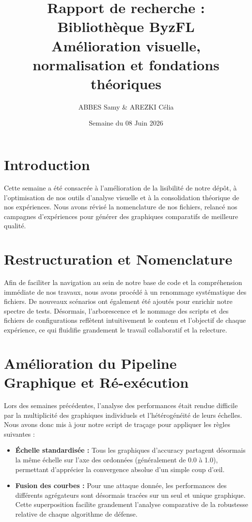 \documentclass[11pt, a4paper]{article}
\title{\textbf{Rapport de recherche : Bibliothèque ByzFL} \\ \large Amélioration visuelle, normalisation et fondations théoriques}
\author{ABBES Samy \& AREZKI Célia}
\date{Semaine du 08 Juin 2026}
\begin{document}
\maketitle

\section{Introduction}
Cette semaine a été consacrée à l'amélioration de la lisibilité de notre dépôt, à l'optimisation de nos outils d'analyse visuelle et à la consolidation théorique de nos expériences. Nous avons révisé la nomenclature de nos fichiers, relancé nos campagnes d'expériences pour générer des graphiques comparatifs de meilleure qualité.

\section{Restructuration et Nomenclature}
Afin de faciliter la navigation au sein de notre base de code et la compréhension immédiate de nos travaux, nous avons procédé à un renommage systématique des fichiers. 
De nouveaux scénarios ont également été ajoutés pour enrichir notre spectre de tests. Désormais, l'arborescence et le nommage des scripts et des fichiers de configurations reflètent intuitivement le contenu et l'objectif de chaque expérience, ce qui fluidifie grandement le travail collaboratif et la relecture.

\section{Amélioration du Pipeline Graphique et Ré-exécution}
Lors des semaines précédentes, l'analyse des performances était rendue difficile par la multiplicité des graphiques individuels et l'hétérogénéité de leurs échelles. Nous avons donc mis à jour notre script de traçage pour appliquer les règles suivantes :
\begin{itemize}
    \item \textbf{Échelle standardisée :} Tous les graphiques d'accuracy partagent désormais la même échelle sur l'axe des ordonnées (généralement de 0.0 à 1.0), permettant d'apprécier la convergence absolue d'un simple coup d'œil.
    \item \textbf{Fusion des courbes :} Pour une attaque donnée, les performances des différents agrégateurs sont désormais tracées sur un seul et unique graphique. Cette superposition facilite grandement l'analyse comparative de la robustesse relative de chaque algorithme de défense.
\end{itemize}
\end{document}
